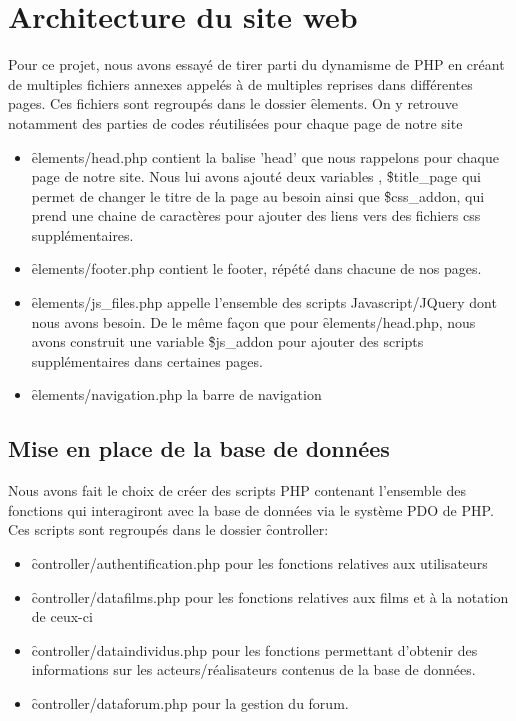 \chapter{Architecture du site web}

    Pour ce projet, nous avons essayé de tirer parti du dynamisme de PHP en créant de multiples fichiers annexes appelés à de multiples reprises dans différentes pages. Ces fichiers sont regroupés dans le dossier \f{elements}. On y retrouve notamment des parties de codes réutilisées pour chaque page de notre site

    \begin{itemize}
        \item \f{elements/head.php} contient la balise 'head' que nous rappelons pour chaque page de notre site. Nous lui avons ajouté deux variables , \f{\$title\_page} qui permet de changer le titre de la page au besoin ainsi que \f{\$css\_addon}, qui prend une chaine de caractères pour ajouter des liens vers des fichiers css supplémentaires.
        \item \f{elements/footer.php} contient le footer, répété dans chacune de nos pages.
        \item \f{elements/js\_files.php} appelle l'ensemble des scripts Javascript/JQuery dont nous avons besoin. De le même façon que pour \f{elements/head.php}, nous avons construit une variable \f{\$js\_addon} pour ajouter des scripts supplémentaires dans certaines pages.
        \item \f{elements/navigation.php} la barre de navigation
    \end{itemize}

    
    \section{Mise en place de la base de données}

        Nous avons fait le choix de créer des scripts PHP contenant l'ensemble des fonctions qui interagiront avec la base de données via le système PDO de PHP. Ces scripts sont regroupés dans le dossier \f{controller}:

        \begin{itemize}
            \item \f{controller/authentification.php} pour les fonctions relatives aux utilisateurs
            \item \f{controller/datafilms.php} pour les fonctions relatives aux films et à la notation de ceux-ci
            \item \f{controller/dataindividus.php} pour les fonctions permettant d'obtenir des informations sur les acteurs/réalisateurs contenus de la base de données.
            \item \f{controller/dataforum.php} pour la gestion du forum.
        \end{itemize}
        

